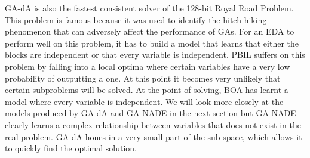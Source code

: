 \documentclass[twoside]{article}
\begin{document}
GA-dA is also the fastest consistent solver of the 128-bit Royal Road Problem. This problem is famous because it was used to identify the hitch-hiking phenomenon that can adversely affect the performance of GAs. For an EDA to perform well on this problem, it has to build a model that learns that either the blocks are independent or that every variable is independent. PBIL suffers on this problem by falling into a local optima where certain variables have a very low probability of outputting a one. At this point it becomes very unlikely that certain subproblems will be solved. At the point of solving, BOA has learnt a model where every variable is independent. We will look more closely at the models produced by GA-dA and GA-NADE in the next section but GA-NADE clearly learns a complex relationship between variables that does not exist in the real problem. GA-dA hones in a very small part of the sub-space, which allows it to quickly find the optimal solution.
%
\end{document}
